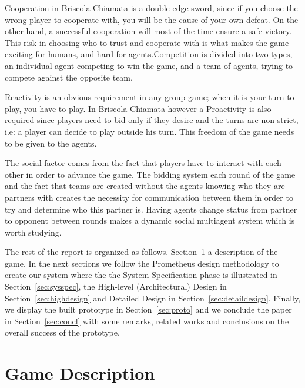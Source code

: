 \documentclass[a4paper]{article}
\begin{document}
Cooperation in Briscola Chiamata is a double-edge sword, since if you choose the wrong player to cooperate with, you will be the cause of your own defeat. On the other hand, a successful cooperation will most of the time ensure a safe victory. This risk in choosing who to trust and cooperate with is what makes the game exciting for humans, and hard for agents.Competition is divided into two types, an individual agent competing to win the game, and a team of agents, trying to compete against the opposite team.

Reactivity is an obvious requirement in any group game; when it is your turn to play, you have to play. In Briscola Chiamata however a Proactivity is also required since players need to bid only if they desire and the turns are non strict, i.e: a player can decide to play outside his turn. This freedom of the game needs to be given to the agents.

The social factor comes from the fact that players have to interact with each other in order to advance the game. The bidding system each round of the game and the fact that teams are created without the agents knowing who they are partners with creates the necessity for communication between them in order to try and determine who this partner is. Having agents change status from partner to opponent between rounds makes a dynamic social multiagent system which is worth studying.

The rest of the report is organized as follows. Section~\ref{sec:gamedescr} a description of the game. In the next sections we follow the Prometheus design methodology to create our system where the the System Specification phase is illustrated in Section~\ref{sec:sysspec}, the High-level (Architectural) Design in Section~\ref{sec:highdesign} and Detailed Design in Section~\ref{sec:detaildesign}. Finally, we display the built prototype in Section~\ref{sec:proto} and we conclude the paper in Section~\ref{sec:concl} with some remarks, related works and conclusions on the overall success of the prototype.

\section{Game Description}\label{sec:gamedescr}
\end{document}
